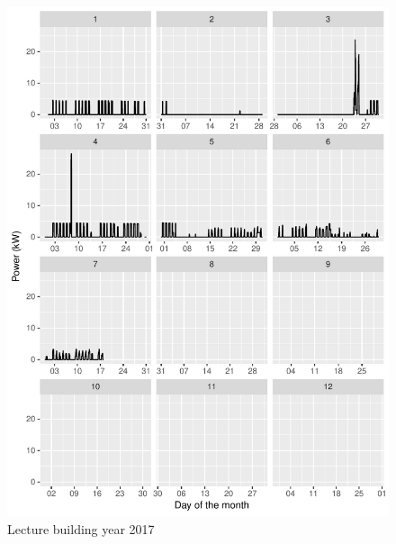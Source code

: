 \documentclass[11pt, oneside]{article}   	%
\begin{document}
\begin{figure}
\includegraphics[keepaspectratio]{lecture_build_Y2017.pdf}
\caption{Lecture building year 2017 }
\end{figure}
\end{document}
